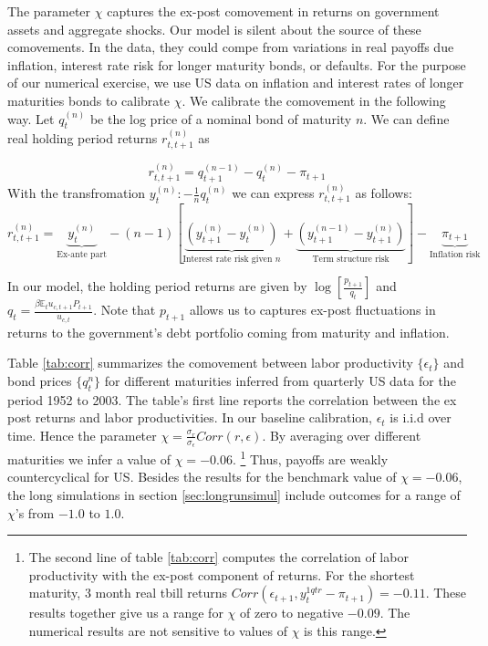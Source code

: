 \documentclass[thmsb,11pt]{article}
\begin{document}
The parameter $\chi$ captures the ex-post comovement in returns on government assets  and aggregate shocks.
Our model is silent about the source of these comovements. In the data,  they could
compe from variations in real payoffs due inflation, interest rate risk for longer maturity bonds,  or defaults.
For the purpose of our numerical exercise, we use US data on inflation and interest rates of longer maturities bonds to calibrate $\chi$.
We calibrate the comovement in the following way.
Let $q^{(n)}_t$ be the log price of a nominal bond of maturity $n$. We can define  real holding period returns $r^{(n)}_{t,t+1}$ as

 \[r^{(n)}_{t,t+1}= q^{(n-1)}_{t+1}-q_t^{(n)}-\pi_{t+1}\]
 With the transfromation $y^{(n)}_t: -\frac{1}{n} q^{(n)}_t$ we can express $r^{(n)}_{t,t+1}$ as follows:
 \[r^{(n)}_{t,t+1}=\underbrace{y^{(n)}_t}_{\text{Ex-ante part}} - (n-1)\left[\underbrace{\left(y^{(n)}_{t+1}-y^{(n)}_{t}\right)}_{\text{Interest rate risk given $n$}}+\underbrace{\left(y^{(n-1)}_{t+1}-y^{(n)}_{t+1}\right)}_{\text{Term structure risk}}\right]-\underbrace{\pi_{t+1}}_{\text{Inflation risk}}\]

 In our model, the holding period returns are given by $\log\left[\frac{p_{t+1}}{q_{t}}\right]$ and $q_t=\frac{\beta \mathbb{E}_tu_{c,t+1}P_{t+1}}{u_{c,t}}$. Note that $p_{t+1}$ allows us to captures ex-post fluctuations in returns to the government's debt  portfolio coming from maturity and inflation.



Table \ref{tab:corr} summarizes the comovement between labor productivity $\{\epsilon_t\}$ and bond prices $\{q^{n}_t\}$ for different maturities inferred from  quarterly US data for the period 1952 to 2003.
The table's first line reports the correlation between the ex post returns and labor productivities.
In our baseline calibration, $\epsilon_{t}$ is i.i.d over time. Hence the parameter $\chi=\frac{\sigma_{r}}{\sigma_{\epsilon}} Corr(r,\epsilon)$.
By averaging over different maturities we infer a value of $\chi=-0.06$. \footnote{The  second line of table \ref{tab:corr} computes
 the correlation of labor productivity with the  ex-post component of returns.
For the shortest maturity, 3 month real tbill returns $ Corr(\epsilon_{t+1},y^{1 qtr}_{t}-\pi_{t+1})=-0.11$. These results together give us a
range for $\chi$ of zero to negative $-0.09$. The numerical results are not sensitive to values of $\chi$ is this range.} Thus,
payoffs are weakly countercyclical for US. Besides the results for the benchmark value of $\chi=-0.06$,
the long simulations in  section \ref{sec:longrunsimul} include outcomes for a  range of $\chi$'s from $-1.0$ to $1.0$.
\end{document}
